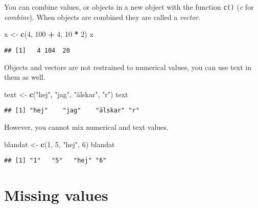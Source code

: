 \documentclass[]{book}
\newenvironment{Shaded}{\begin{snugshade}}{\end{snugshade}}
\newcommand{\DecValTok}[1]{\textcolor[rgb]{0.00,0.00,0.81}{#1}}
\newcommand{\KeywordTok}[1]{\textcolor[rgb]{0.13,0.29,0.53}{\textbf{#1}}}
\newcommand{\NormalTok}[1]{#1}
\newcommand{\OperatorTok}[1]{\textcolor[rgb]{0.81,0.36,0.00}{\textbf{#1}}}
\newcommand{\StringTok}[1]{\textcolor[rgb]{0.31,0.60,0.02}{#1}}
\begin{document}
You can combine values, or objects in a new object with the function \texttt{c()} (\emph{c} for \emph{combine}).
When objects are combined they are called a \emph{vector}.

\begin{Shaded}
\begin{Highlighting}[]
\NormalTok{x <-}\StringTok{ }\KeywordTok{c}\NormalTok{(}\DecValTok{4}\NormalTok{, }\DecValTok{100} \OperatorTok{+}\StringTok{ }\DecValTok{4}\NormalTok{, }\DecValTok{10} \OperatorTok{*}\StringTok{ }\DecValTok{2}\NormalTok{)}
\NormalTok{x}
\end{Highlighting}
\end{Shaded}

\begin{verbatim}
## [1]   4 104  20
\end{verbatim}

Objects and vectors are not restrained to numerical values, you can use text in them as well.

\begin{Shaded}
\begin{Highlighting}[]
\NormalTok{text <-}\StringTok{ }\KeywordTok{c}\NormalTok{(}\StringTok{"hej"}\NormalTok{, }\StringTok{"jag"}\NormalTok{, }\StringTok{"älskar"}\NormalTok{, }\StringTok{"r"}\NormalTok{)}
\NormalTok{text}
\end{Highlighting}
\end{Shaded}

\begin{verbatim}
## [1] "hej"    "jag"    "älskar" "r"
\end{verbatim}

However, you cannot mix numerical and text values.

\begin{Shaded}
\begin{Highlighting}[]
\NormalTok{blandat <-}\StringTok{ }\KeywordTok{c}\NormalTok{(}\DecValTok{1}\NormalTok{, }\DecValTok{5}\NormalTok{, }\StringTok{"hej"}\NormalTok{, }\DecValTok{6}\NormalTok{)}
\NormalTok{blandat}
\end{Highlighting}
\end{Shaded}

\begin{verbatim}
## [1] "1"   "5"   "hej" "6"
\end{verbatim}

\hypertarget{missing-values}{%
\section{Missing values}\label{missing-values}}
\end{document}
